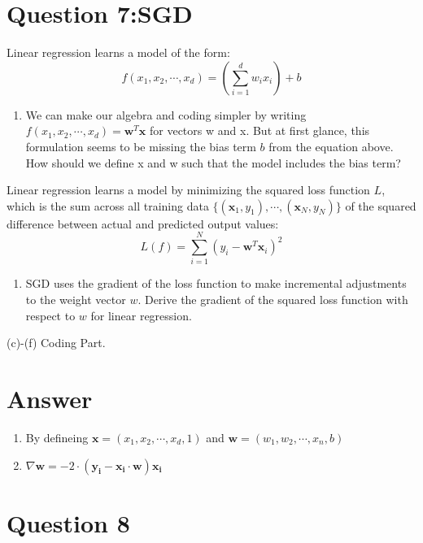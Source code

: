 \documentclass[
	12pt, %
]{fphw}
\begin{document}
\section*{Question 7:SGD}

\begin{problem}
	Linear regression learns a model of the form:
	$$f\left(x_{1},x_{2},\cdots,x_{d}\right)=\left(\sum_{i=1}^{d}w_{i}x_{i}\right)+b$$
	\begin{enumerate}
	\item We can make our algebra and coding simpler by writing $f\left(x_1,x_2,\cdots,x_d\right)=\mathbf{w}^T\mathbf{x}$ for vectors w and x. But at first glance, this formulation seems to be missing the bias term $b$ from the equation above. How should we define x and w such that the model includes the bias term?
	
\end{enumerate}
\medskip
Linear regression learns a model by minimizing the squared loss function $L$, which is the sum across all training data $\{(\mathbf{x}_1,y_1),\cdots,(\mathbf{x}_N,y_N)\}$ of the squared difference between actual and predicted output values:
$$L(f)=\sum_{i=1}^N\left(y_i-\mathbf{w}^T\mathbf{x}_i\right)^2$$
\begin{enumerate}
	\item  SGD uses the gradient of the loss function to make incremental adjustments to the weight vector $w$. Derive the gradient of the squared loss function with respect to $w$ for linear regression.
\end{enumerate}
(c)-(f) Coding Part.
\end{problem}
\section*{Answer}
\begin{enumerate}
	\item By defineing $\mathbf{x} = (x_1,x_2,\cdots,x_d, 1)$ and $\mathbf{w} = (w_1,w_2,\cdots,x_n, b)$
	\item $ \nabla \mathbf{w}= -2 \cdot (\mathbf{y_i} - \mathbf{x_i} \cdot \mathbf{w}) \mathbf{x_i}$

\end{enumerate}
\section*{Question 8}
\end{document}
